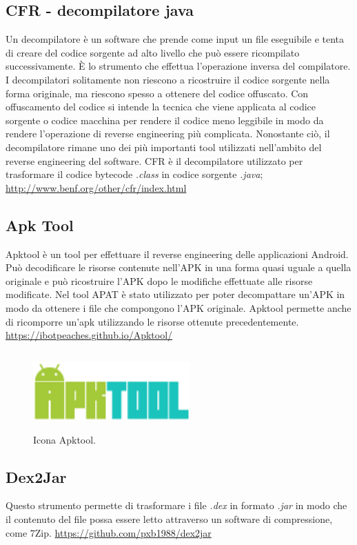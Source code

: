 \subsection*{CFR - decompilatore java}
Un decompilatore è un software che prende come input un file eseguibile e tenta di creare del codice sorgente ad alto livello che può essere ricompilato successivamente.
È lo strumento che effettua l'operazione inversa del compilatore.
I decompilatori solitamente non riescono a ricostruire il codice sorgente nella forma originale, ma riescono spesso a ottenere del codice offuscato.
Con offuscamento del codice si intende la tecnica che viene applicata al codice sorgente o codice macchina per rendere il codice meno leggibile in modo da rendere l'operazione di reverse engineering più complicata.
Nonostante ciò, il decompilatore rimane uno dei più importanti tool utilizzati nell'ambito del reverse engineering del software.
CFR è il decompilatore utilizzato per trasformare il codice bytecode \textit{.class} in codice sorgente \textit{.java};
\url{http://www.benf.org/other/cfr/index.html}

\subsection*{Apk Tool}
Apktool è un tool per effettuare il reverse engineering delle applicazioni Android.
Può decodificare le risorse contenute nell'APK in una forma quasi uguale a quella originale e può ricostruire l'APK dopo le modifiche effettuate alle risorse modificate.
Nel tool APAT è stato utilizzato per poter decompattare un'APK in modo da ottenere i file che compongono l'APK originale.
Apktool permette anche di ricomporre un'apk utilizzando le risorse ottenute precedentemente.
\url{https://ibotpeaches.github.io/Apktool/}
\begin{figure}[H]
    \centering
    \includegraphics[width=6cm, height=3cm]{./immagini/apktool.png}
    \caption{Icona Apktool.}\label{fig:apktool}
\end{figure}

\subsection*{Dex2Jar}
Questo strumento permette di trasformare i file \textit{.dex} in formato \textit{.jar} in modo
che il contenuto del file possa essere letto attraverso un software di compressione, come 7Zip.
\url{https://github.com/pxb1988/dex2jar}

